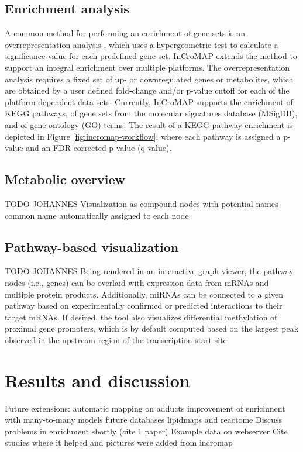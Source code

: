 \documentclass[final,5p,times,twocolumn]{elsarticle}
\begin{document}
\subsection{Enrichment analysis}
A common method for performing an enrichment of gene sets is an overrepresentation analysis \cite{Backes2007}, which uses a hypergeometric test to calculate a significance value for each predefined gene set. InCroMAP extends the method to support an integral enrichment over multiple platforms. The overrepresentation analysis requires a fixed set of up- or downregulated genes or metabolites, which are obtained by a user defined fold-change and/or p-value cutoff for each of the platform dependent data sets. Currently, InCroMAP supports the enrichment of KEGG pathways, of gene sets from the molecular signatures database (MSigDB), and of gene ontology (GO) terms. The result of a KEGG pathway enrichment is depicted in Figure \ref{fig:incromap-workflow}, where each pathway is assigned a p-value and an FDR corrected p-value (q-value).

\subsection{Metabolic overview}
TODO JOHANNES
Visualization as compound nodes with potential names
common name automatically assigned to each node

\subsection{Pathway-based visualization}
TODO JOHANNES
Being rendered in an interactive graph viewer, the pathway nodes (i.e., genes) can be overlaid with expression data from mRNAs and multiple protein products. Additionally, miRNAs can be connected to a given pathway based on experimentally confirmed or predicted interactions to their target mRNAs. If desired, the tool also visualizes differential methylation of proximal gene promoters, which is by default computed based on the largest peak observed in the upstream region of the transcription start site.


\section{Results and discussion}

Future extensions: automatic mapping on adducts
improvement of enrichment with many-to-many models
future databases lipidmaps\cite{Sud2007} and reactome \cite{Eustachio2011}
Discuss problems in enrichment shortly (cite 1 paper)
Example data on webserver
Cite studies where it helped and pictures were added from incromap
\end{document}
